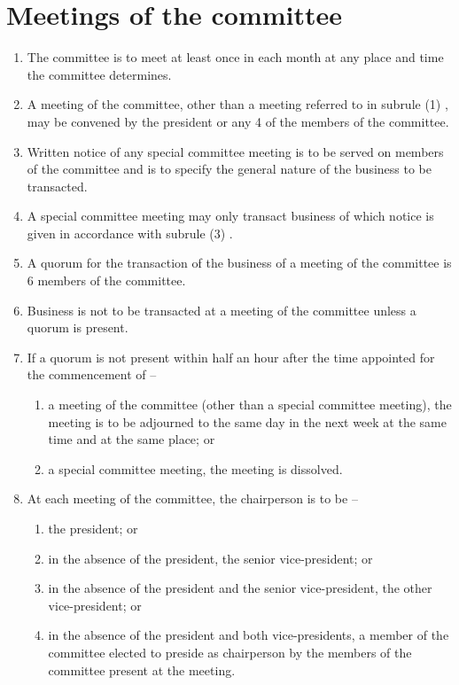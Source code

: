 \documentclass[a4paper,11pt]{article}
\begin{document}
\section{Meetings of the committee}
\begin{enumerate}
	\item The committee is to meet at least once in each month at any place and time the committee determines.
	\item A meeting of the committee, other than a meeting referred to in subrule (1) , may be convened by the president or any 4 of the members of the committee.
	\item Written notice of any special committee meeting is to be served on members of the committee and is to specify the general nature of the business to be transacted.
	\item A special committee meeting may only transact business of which notice is given in accordance with subrule (3) .
	\item A quorum for the transaction of the business of a meeting of the committee is 6 members of the committee.
	\item Business is not to be transacted at a meeting of the committee unless a quorum is present.
	
	\item If a quorum is not present within half an hour after the time appointed for the commencement of --
	\begin{enumerate}
		\item a meeting of the committee (other than a special committee meeting), the meeting is to be adjourned to the same day in the next week at the same time and at the same place; or
		\item a special committee meeting, the meeting is dissolved.
	\end{enumerate}
	
	\item At each meeting of the committee, the chairperson is to be --
	\begin{enumerate}
		\item the president; or
		\item in the absence of the president, the senior vice-president; or
		\item in the absence of the president and the senior vice-president, the other vice-president; or
		\item in the absence of the president and both vice-presidents, a member of the committee elected to preside as chairperson by the members of the committee present at the meeting.
	\end{enumerate}
	

\end{enumerate}
\end{document}

